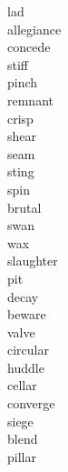 \documentclass[a4paper, 11pt]{ctexart}
\begin{document}
\begin{multicols*}{3}
    \begin{description}

\item[lad]

\item[allegiance]

\item[concede]

\item[stiff]

\item[pinch]

\item[remnant]

\item[crisp]

\item[shear]

\item[seam]

\item[sting]

\item[spin]

\item[brutal]

\item[swan]

\item[wax]

\item[slaughter]

\item[pit]

\item[decay]

\item[beware]

\item[valve]

\item[circular]

\item[huddle]

\item[cellar]

\item[converge]

\item[siege]

\item[blend]

\item[pillar]


\end{description}
\end{multicols*}
\end{document}
